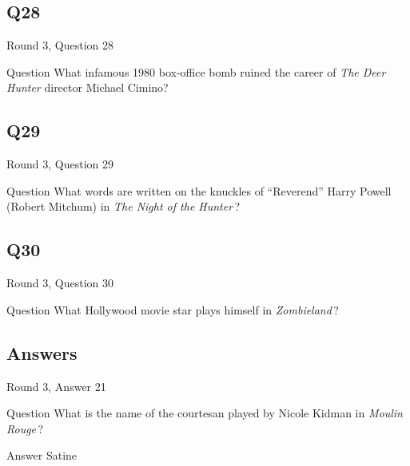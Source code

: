 \documentclass[11pt]{beamer}
\begin{document}
\subsection*{Q28}
\begin{frame}[t]{Round 3, Question 28}
\vspace{2em}
\begin{block}{Question}
What infamous 1980 box-office bomb ruined the career of \emph{The Deer Hunter} director Michael Cimino?
\end{block}
\end{frame}
    

\subsection*{Q29}
\begin{frame}[t]{Round 3, Question 29}
\vspace{2em}
\begin{block}{Question}
What words are written on the knuckles of ``Reverend'' Harry Powell (Robert Mitchum) in \emph{The Night of the Hunter}\,?
\end{block}
\end{frame}
    

\subsection*{Q30}
\begin{frame}[t]{Round 3, Question 30}
\vspace{2em}
\begin{block}{Question}
What Hollywood movie star plays himself in \emph{Zombieland}\,?
\end{block}
\end{frame}
    
\subsection{Answers}

\begin{frame}[t]{Round 3, Answer 21}
\vspace{2em}
\begin{block}{Question}
What is the name of the courtesan played by Nicole Kidman in \emph{Moulin Rouge}\,?
\end{block}
\pause{}
\begin{block}{Answer}
Satine
\end{block}
\end{frame}
    
\end{document}
